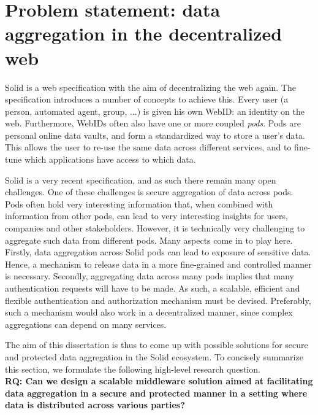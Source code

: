 \section{Problem statement: data aggregation in the decentralized web}
\label{sec:problem}
 Solid is a web specification with the aim of decentralizing the web again. The specification introduces a number of concepts to achieve this. Every user (a person, automated agent, group, ...) is given his own WebID: an identity on the web. Furthermore, WebIDs often also have one or more coupled \textit{pods}. Pods are personal online data vaults, and form a standardized way to store a user's data. This allows the user to re-use the same data across different services, and to fine-tune which applications have access to which data.

Solid is a very recent specification, and as such there remain many open challenges. One of these challenges is secure aggregation of data across pods. Pods often hold very interesting information that, when combined with information from other pods, can lead to very interesting insights for users, companies and other stakeholders. However, it is technically very challenging to aggregate such data from different pods. Many aspects come in to play here. Firstly, data aggregation across Solid pods can lead to exposure of sensitive data. Hence, a mechanism to release data in a more fine-grained and controlled manner is necessary. Secondly, aggregating data across many pods implies that many authentication requests will have to be made. As such, a scalable, efficient and flexible authentication and authorization mechanism must be devised. Preferably, such a mechanism would also work in a decentralized manner, since complex aggregations can depend on many services.

The aim of this dissertation is thus to come up with possible solutions for secure and protected data aggregation in the Solid ecosystem. 
To concisely summarize this section, we formulate the following high-level research question.\\

\noindent \textbf{RQ: Can we design a scalable middleware solution aimed at facilitating data aggregation in a secure and protected manner in a setting where data is distributed across various parties?
}

